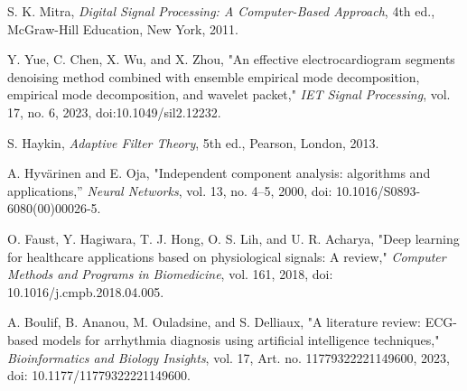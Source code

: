\documentclass{citask}
\begin{document}
\begin{thebibliography}{1}
S. K. Mitra, \emph{Digital Signal Processing: A Computer-Based Approach}, 4th ed., McGraw-Hill Education, New York, 2011.

Y. Yue, C. Chen, X. Wu, and X. Zhou, "An effective electrocardiogram segments denoising method combined with ensemble empirical mode decomposition, empirical mode decomposition, and wavelet packet," \emph{IET Signal Processing}, vol. 17, no. 6, 2023, doi:10.1049/sil2.12232.

S. Haykin, \emph{Adaptive Filter Theory}, 5th ed., Pearson, London, 2013.

A. Hyvärinen and E. Oja, "Independent component analysis: algorithms and applications,” \emph{Neural Networks}, vol. 13, no. 4–5, 2000, doi: 10.1016/S0893-6080(00)00026-5.

O. Faust, Y. Hagiwara, T. J. Hong, O. S. Lih, and U. R. Acharya, "Deep learning for healthcare applications based on physiological signals: A review," \emph{Computer Methods and Programs in Biomedicine}, vol. 161, 2018, doi: 10.1016/j.cmpb.2018.04.005.


A. Boulif, B. Ananou, M. Ouladsine, and S. Delliaux, "A literature review: ECG-based models for arrhythmia diagnosis using artificial intelligence techniques," \emph{Bioinformatics and Biology Insights}, vol. 17, Art. no. 11779322221149600, 2023, doi: 10.1177/11779322221149600.


\end{thebibliography}
\end{document}
